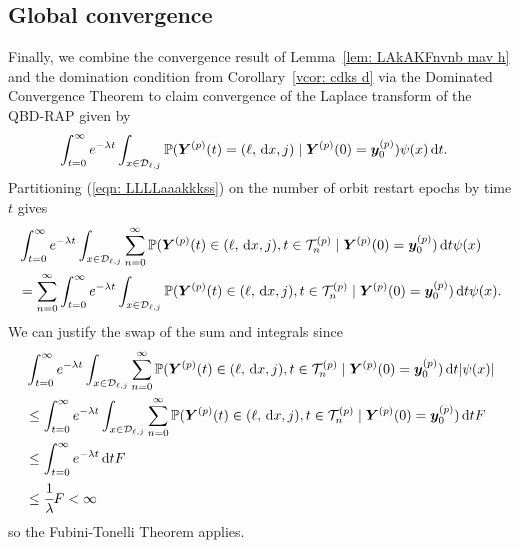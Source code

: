 \subsection{Global convergence}\label{sec: sub global}
Finally, we combine the convergence result of Lemma~\ref{lem: LAkAKFnvnb mav h} and the domination condition from Corollary~\ref{vcor: cdks d} via the Dominated Convergence Theorem to claim convergence of the Laplace transform of the QBD-RAP given by 
\begin{align}
	&\int_{t=0}^\infty e^{-\lambda t}\int_{x\in\mathcal D_{\ell,j}}\mathbb P( {\boldsymbol Y}^{(p)}(t) = (\ell,\, \mathrm{d} x,j)\mid \boldsymbol Y^{(p)}(0)=\boldsymbol y_0^{(p)})  \psi(x)\, \mathrm{d} t. \label{eqn: LLLLaaakkkss}
\end{align}
Partitioning (\ref{eqn: LLLLaaakkkss}) on the number of orbit restart epochs by time \(t\) gives
\begin{align}
	& \int_{t=0}^\infty e^{-\lambda t}\int_{x\in\mathcal D_{\ell,j}}\sum_{n=0}^\infty \mathbb P(  {\boldsymbol Y}^{(p)}(t) \in (\ell, \, \mathrm{d} x, j), t\in\mathcal T_n^{(p)} \mid\nonumber 
	\boldsymbol Y^{(p)}(0)=\boldsymbol y_0^{(p)})\, \mathrm{d} t \psi(x) \nonumber
	\\&=\sum_{n=0}^\infty\int_{t=0}^\infty e^{-\lambda t}\int_{x\in\mathcal D_{\ell,j}} \mathbb P( {\boldsymbol Y}^{(p)}(t) \in (\ell, \, \mathrm{d} x, j), t\in\mathcal T_n^{(p)} \mid  
	\boldsymbol Y^{(p)}(0)=\boldsymbol y_0^{(p)})\, \mathrm{d} t \psi(x). \label{eqn: KLDNVnav}
\end{align}
We can justify the swap of the sum and integrals since 
\begin{align}
	& \int_{t=0}^\infty e^{-\lambda t}\int_{x\in\mathcal D_{\ell,j}}\sum_{n=0}^\infty \mathbb P(  {\boldsymbol Y}^{(p)}(t) \in (\ell, \, \mathrm{d} x, j), t\in\mathcal T_n^{(p)} \mid\nonumber 
	\boldsymbol Y^{(p)}(0)=\boldsymbol y_0^{(p)})\, \mathrm{d} t |\psi(x)| \nonumber
	\\&\leq \int_{t=0}^\infty e^{-\lambda t}\int_{x\in\mathcal D_{\ell,j}}\sum_{n=0}^\infty \mathbb P(  {\boldsymbol Y}^{(p)}(t) \in (\ell, \, \mathrm{d} x, j), t\in\mathcal T_n^{(p)} \mid\nonumber 
	\boldsymbol Y^{(p)}(0)=\boldsymbol y_0^{(p)})\, \mathrm{d} t F \nonumber
	\\&\leq \int_{t=0}^\infty e^{-\lambda t}\, \mathrm{d} t F \nonumber
	\\&\leq \cfrac{1}{\lambda} F<\infty \nonumber
\end{align}
so the Fubini-Tonelli Theorem applies.

